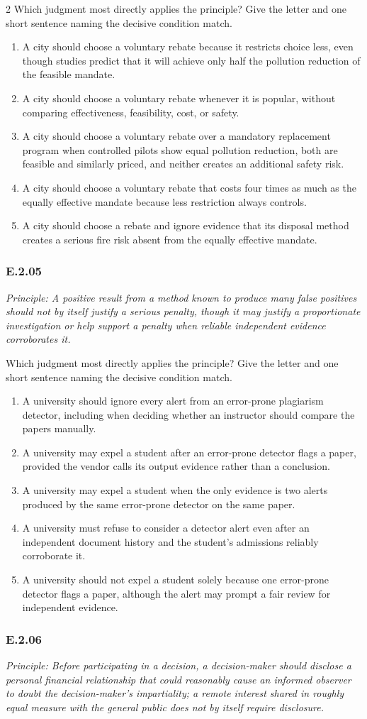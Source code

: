\documentclass[10pt]{extarticle}
\newcommand{\choice}[1]{\item #1}
\newcommand{\bankitem}[1]{\subsubsection*{#1}}
\begin{document}
\begin{multicols}{2}
Which judgment most directly applies the principle? Give the letter and one short sentence naming the decisive condition match.
\begin{enumerate}[label=(\alph*)]
  \choice{A city should choose a voluntary rebate because it restricts choice less, even though studies predict that it will achieve only half the pollution reduction of the feasible mandate.}
  \choice{A city should choose a voluntary rebate whenever it is popular, without comparing effectiveness, feasibility, cost, or safety.}
  \choice{A city should choose a voluntary rebate over a mandatory replacement program when controlled pilots show equal pollution reduction, both are feasible and similarly priced, and neither creates an additional safety risk.}
  \choice{A city should choose a voluntary rebate that costs four times as much as the equally effective mandate because less restriction always controls.}
  \choice{A city should choose a rebate and ignore evidence that its disposal method creates a serious fire risk absent from the equally effective mandate.}
\end{enumerate}
\bankitem{E.2.05}
\emph{Principle: A positive result from a method known to produce many false positives should not by itself justify a serious penalty, though it may justify a proportionate investigation or help support a penalty when reliable independent evidence corroborates it.}

Which judgment most directly applies the principle? Give the letter and one short sentence naming the decisive condition match.
\begin{enumerate}[label=(\alph*)]
  \choice{A university should ignore every alert from an error-prone plagiarism detector, including when deciding whether an instructor should compare the papers manually.}
  \choice{A university may expel a student after an error-prone detector flags a paper, provided the vendor calls its output evidence rather than a conclusion.}
  \choice{A university may expel a student when the only evidence is two alerts produced by the same error-prone detector on the same paper.}
  \choice{A university must refuse to consider a detector alert even after an independent document history and the student's admissions reliably corroborate it.}
  \choice{A university should not expel a student solely because one error-prone detector flags a paper, although the alert may prompt a fair review for independent evidence.}
\end{enumerate}
\bankitem{E.2.06}
\emph{Principle: Before participating in a decision, a decision-maker should disclose a personal financial relationship that could reasonably cause an informed observer to doubt the decision-maker's impartiality; a remote interest shared in roughly equal measure with the general public does not by itself require disclosure.}


\end{multicols}
\end{document}
